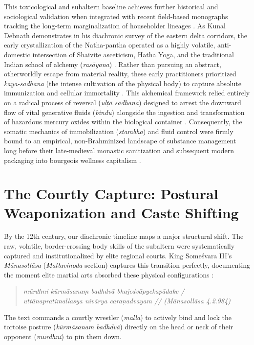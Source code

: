 \documentclass[11pt,twoside,letterpaper]{article}
\begin{document}
This toxicological and subaltern baseline achieves further historical and sociological validation when integrated with recent field-based monographs tracking the long-term marginalization of householder lineages \cite{Debnath2024}. As Kunal Debnath demonstrates in his diachronic survey of the eastern delta corridors, the early crystallization of the Natha-pantha operated as a highly volatile, anti-domestic intersection of Shaivite asceticism, Hatha Yoga, and the traditional Indian school of alchemy (\textit{rasāyana}) \cite{Debnath2024}. Rather than pursuing an abstract, otherworldly escape from material reality, these early practitioners prioritized \textit{kāya-sādhana} (the intense cultivation of the physical body) to capture absolute immunization and cellular immortality \cite{Debnath2024}. This alchemical framework relied entirely on a radical process of reversal (\textit{ulṭā sādhana}) designed to arrest the downward flow of vital generative fluids (\textit{bindu}) alongside the ingestion and transformation of hazardous mercury oxides within the biological container \cite{Debnath2024}. Consequently, the somatic mechanics of immobilization (\textit{stambha}) and fluid control were firmly bound to an empirical, non-Brahminized landscape of substance management long before their late-medieval monastic sanitization and subsequent modern packaging into bourgeois wellness capitalism \cite{Debnath2024, McCartney2021}.


\section{The Courtly Capture: Postural Weaponization and Caste Shifting}

By the 12th century, our diachronic timeline maps a major structural shift. The raw, volatile, border-crossing body skills of the subaltern were systematically captured and institutionalized by elite regional courts. King Someśvara III’s \textit{Mānasollāsa} (\textit{Mallavinoda} section) captures this transition perfectly, documenting the moment elite martial arts absorbed these physical configurations \cite{Mān_3}:
\begin{quote}
    \textit{mūrdhni kūrmāsanaṃ badhdvā bhajedvāpyekapādake /} \\
    \textit{uttānapratimallasya nivārya caraṇadvayam // (Mānasollāsa 4.2.984)}
\end{quote}

The text commands a courtly wrestler (\textit{malla}) to actively bind and lock the tortoise posture (\textit{kūrmāsanam badhdvā}) directly on the head or neck of their opponent (\textit{mūrdhni}) to pin them down. 
\end{document}
